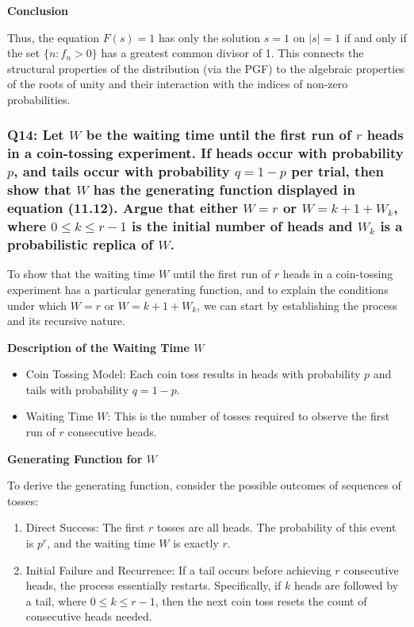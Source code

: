 \documentclass[8pt]{article}
\begin{document}
\textbf{Conclusion}

Thus, the equation \( F(s) = 1 \) has only the solution \( s = 1 \) on \( |s| = 1 \) if and only if the set \( \{ n : f_n > 0 \} \) has a greatest common divisor of 1. This connects the structural properties of the distribution (via the PGF) to the algebraic properties of the roots of unity and their interaction with the indices of non-zero probabilities.

\subsubsection*{Q14:
Let \(W\) be the waiting time until the first run of \(r\) heads in a coin-tossing experiment. If heads occur with probability \(p\), and tails occur with probability \(q = 1 - p\) per trial, then show that \(W\) has the generating function displayed in equation (11.12). Argue that either \(W = r\) or \(W = k + 1 + W_k\), where \(0 \leq k \leq r - 1\) is the initial number of heads and \(W_k\) is a probabilistic replica of \(W\).}

To show that the waiting time \( W \) until the first run of \( r \) heads in a coin-tossing experiment has a particular generating function, and to explain the conditions under which \( W = r \) or \( W = k + 1 + W_k \), we can start by establishing the process and its recursive nature.

\textbf{Description of the Waiting Time \( W \)}

\begin{itemize}
    \item Coin Tossing Model: Each coin toss results in heads with probability \( p \) and tails with probability \( q = 1-p \).
    \item Waiting Time \( W \): This is the number of tosses required to observe the first run of \( r \) consecutive heads.
\end{itemize}

\textbf{Generating Function for \( W \)}

To derive the generating function, consider the possible outcomes of sequences of tosses:
\begin{enumerate}
    \item Direct Success: The first \( r \) tosses are all heads. The probability of this event is \( p^r \), and the waiting time \( W \) is exactly \( r \).
    \item Initial Failure and Recurrence: If a tail occurs before achieving \( r \) consecutive heads, the process essentially restarts. Specifically, if \( k \) heads are followed by a tail, where \( 0 \leq k \leq r-1 \), then the next coin toss resets the count of consecutive heads needed.
\end{enumerate}
\end{document}

